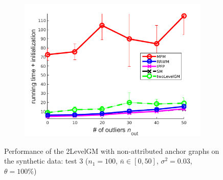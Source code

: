 \begin{figure}
\begin{subfigure}[b]{0.33\textwidth}
			\includegraphics[scale=0.25]{"chapter3/fig/SyntheticTest/no_descr/Results_v4.3.3/Test1/time_summary_avg10t"} 
		\end{subfigure} 	
	\caption[Performance of the 2LevelGM with non-attributed anchor graphs on the synthetic data (test $3$)]{Performance of the 2LevelGM with non-attributed anchor graphs on the synthetic data: test $3$ ($n_1=100$, $\bar{n}\in[0,50]$, $\sigma^2=0.03$, $\theta=100\%$)}
	\label{fig:synTest3_ver433}
\end{figure}
